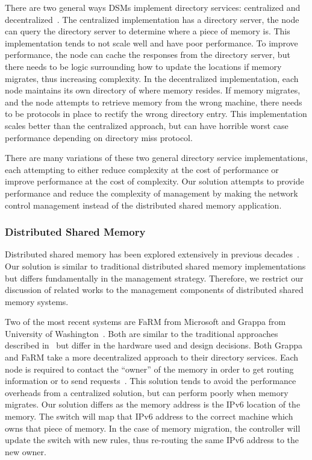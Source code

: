 There are two general ways DSMs implement directory services: centralized and decentralized~\cite{Nitzberg1991}. The centralized implementation has a directory server, the node can query the directory server to determine where a piece of memory is. This implementation tends to not scale well and have poor performance. To improve performance, the node can cache the responses from the directory server, but there needs to be logic surrounding how to update the locations if memory migrates, thus increasing complexity. In the decentralized implementation, each node maintains its own directory of where memory resides. If memory migrates, and the node attempts to retrieve memory from the wrong machine, there needs to be protocols in place to rectify the wrong directory entry. This implementation scales better than the centralized approach, but can have horrible worst case performance depending on directory miss protocol.~\cite{Nitzberg1991}

There are many variations of these two general directory service implementations, each attempting to either reduce complexity at the cost of performance or improve performance at the cost of complexity. Our solution attempts to provide performance and reduce the complexity of management by making the network control management instead of the distributed shared memory application.

\subsubsection{Distributed Shared Memory} 
Distributed shared memory has been explored extensively in previous decades~\cite{treadmarks, gms, Protic1996, Nitzberg1991, grappa, farm}. Our solution is similar to traditional distributed shared memory implementations but differs fundamentally in the management strategy. Therefore, we restrict our discussion of related works to the management components of distributed shared memory systems.

Two of the most recent systems are FaRM from Microsoft\cite{farm} and Grappa from University of Washington~\cite{grappa}. Both are similar to the traditional approaches described in~\cite{Protic1996, Nitzberg1991} but differ in the hardware used and design decisions. Both Grappa and FaRM take a more decentralized approach to their directory services. Each node is required to contact the ``owner'' of the memory in order to get routing information or to send requests~\cite{grappa, farm}. This solution tends to avoid the performance overheads from a centralized solution, but can perform poorly when memory migrates. Our solution differs as the memory address is the IPv6 location of the memory. The switch will map that IPv6 address to the correct machine which owns that piece of memory. In the case of memory migration, the controller will update the switch with new rules, thus re-routing the same IPv6 address to the new owner.

